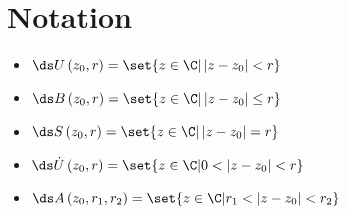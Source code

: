 \documentclass[10pt]{mypackage}
\begin{document}
\section{Notation}%
\begin{itemize}
  \item $\ds U\left( z_0,r \right) = \set{z\in \C | \left\vert z-z_0 \right\vert < r}$
  \item $\ds B\left( z_0,r \right) = \set{z\in \C | \left\vert z-z_0 \right\vert \leq r}$
  \item $\ds S\left( z_0,r \right) = \set{z\in \C | \left\vert z-z_0 \right\vert = r}$
  \item $\ds \dot{U}\left( z_0,r \right) = \set{z\in \C | 0 < \left\vert z-z_0 \right\vert < r}$
  \item $\ds A\left( z_0,r_1,r_2 \right) = \set{z\in \C | r_1 < \left\vert z-z_0 \right\vert < r_2}$
\end{itemize}
\end{document}
